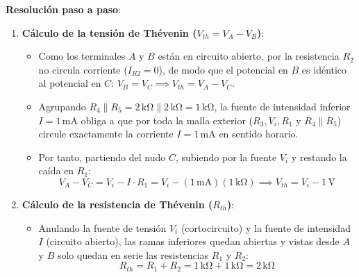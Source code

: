 \begin{ejercicio}
\textbf{Resolución paso a paso}:
\begin{enumerate}
    \item \textbf{Cálculo de la tensión de Thévenin ($V_{th} = V_A - V_B$)}:
    \begin{itemize}
        \item Como los terminales $A$ y $B$ están en circuito abierto, por la resistencia $R_2$ no circula corriente ($I_{R2} = 0$), de modo que el potencial en $B$ es idéntico al potencial en $C$: $V_B = V_C \implies V_{th} = V_A - V_C$.
        \item Agrupando $R_4 \parallel R_5 = 2\,\si{\kilo\ohm} \parallel 2\,\si{\kilo\ohm} = 1\,\si{\kilo\ohm}$, la fuente de intensidad inferior $I = 1\,\si{\milli\ampere}$ obliga a que por toda la malla exterior ($R_3, V_i, R_1$ y $R_4\parallel R_5$) circule exactamente la corriente $I = 1\,\si{\milli\ampere}$ en sentido horario.
        \item Por tanto, partiendo del nudo $C$, subiendo por la fuente $V_i$ y restando la caída en $R_1$:
        \begin{equation*}
            V_A - V_C = V_i - I\cdot R_1 = V_i - (1\,\si{\milli\ampere})(1\,\si{\kilo\ohm}) \implies \boxed{V_{th} = V_i - 1\,\si{\volt}}
        \end{equation*}
    \end{itemize}
    \item \textbf{Cálculo de la resistencia de Thévenin ($R_{th}$)}:
    \begin{itemize}
        \item Anulando la fuente de tensión $V_i$ (cortocircuito) y la fuente de intensidad $I$ (circuito abierto), las ramas inferiores quedan abiertas y vistas desde $A$ y $B$ solo quedan en serie las resistencias $R_1$ y $R_2$:
        \begin{equation*}
            \boxed{R_{th} = R_1 + R_2 = 1\,\si{\kilo\ohm} + 1\,\si{\kilo\ohm} = 2\,\si{\kilo\ohm}}
        \end{equation*}
    \end{itemize}
\end{enumerate}
\end{ejercicio}

